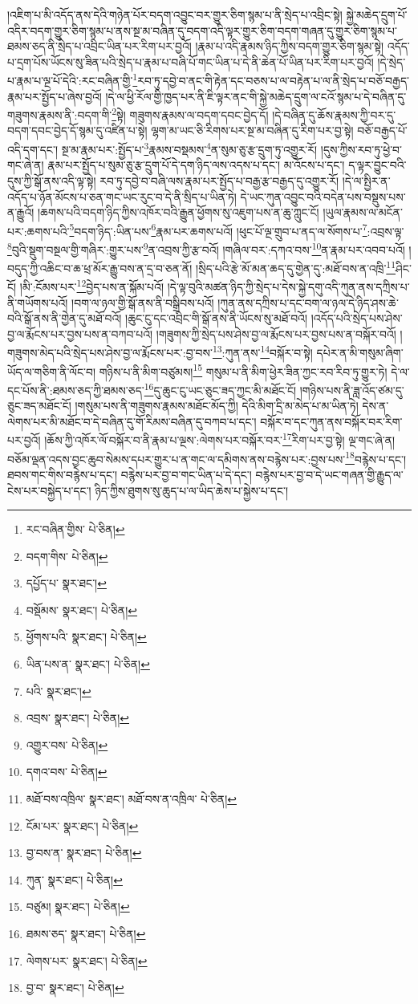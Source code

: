 །འཇིག་པ་མི་འདོད་ནས་དེའི་གཉེན་པོར་བདག་འབྱུང་བར་གྱུར་ཅིག་སྙམ་པ་ནི་སྲེད་པ་འབྲིང་སྟེ། སྐྱེ་མཆེད་དྲུག་པོ་འདིར་བདག་གྱུར་ཅིག་སྙམ་པ་ནས་སྔ་མ་བཞིན་དུ་བདག་འདི་ལྟར་གྱུར་ཅིག་བདག་གཞན་དུ་གྱུར་ཅིག་སྙམ་པ་ཐམས་ཅད་ནི་སྲེད་པ་འབྲིང་ཡིན་པར་རིག་པར་བྱའོ། །རྣམ་པ་འདི་རྣམས་ཉིད་ཀྱིས་བདག་གྱུར་ཅིག་སྙམ་སྟེ། འདོད་པ་དྲག་པོས་ཡོངས་སུ་ཟིན་པའི་སྲེད་པ་རྣམ་པ་བཞི་པོ་གང་ཡིན་པ་དེ་ནི་ཆེན་པོ་ཡིན་པར་རིག་པར་བྱའོ། །དེ་སྲེད་པ་རྣམ་པ་ལྔ་པོ་དེའི་:རང་བཞིན་གྱི་\footnote{རང་བཞིན་གྱིས་  པེ་ཅིན། }རབ་ཏུ་དབྱེ་བ་ནང་གི་རྟེན་དང་བཅས་པ་ལ་བརྟེན་པ་ལ་ནི་སྲེད་པ་བཅོ་བརྒྱད་རྣམ་པར་སྤྱོད་པ་ཞེས་བྱའོ། །དེ་ལ་ཕྱི་རོལ་གྱི་ཁྱད་པར་ནི་ཇི་ལྟར་ནང་གི་སྐྱེ་མཆེད་དྲུག་ལ་ངའོ་སྙམ་པ་དེ་བཞིན་དུ་གཟུགས་རྣམས་ནི་:བདག་གི་\footnote{བདག་གིས་  པེ་ཅིན། }སྟེ། གཟུགས་རྣམས་ལ་བདག་དབང་བྱེད་དོ། །དེ་བཞིན་དུ་ཆོས་རྣམས་ཀྱི་བར་དུ་བདག་དབང་བྱེད་དོ་སྙམ་དུ་འཛིན་པ་སྟེ། ལྷག་མ་ཡང་ཅི་རིགས་པར་སྔ་མ་བཞིན་དུ་རིག་པར་བྱ་སྟེ། བཅོ་བརྒྱད་པོ་འདི་དག་དང་། སྔ་མ་རྣམ་པར་:སྤྱོད་པ་\footnote{དཔྱོད་པ་  སྣར་ཐང་། }རྣམས་བསྡམས་\footnote{བསྡོམས་  སྣར་ཐང་།  པེ་ཅིན། }ན་སུམ་ཅུ་རྩ་དྲུག་ཏུ་འགྱུར་རོ། །དུས་ཀྱིས་རབ་ཏུ་ཕྱེ་བ་གང་ཞེ་ན། རྣམ་པར་སྤྱོད་པ་སུམ་ཅུ་རྩ་དྲུག་པོ་དེ་དག་ཉིད་ལས་འདས་པ་དང་། མ་འོངས་པ་དང་། ད་ལྟར་བྱུང་བའི་དུས་ཀྱི་སྒོ་ནས་འདི་ལྟ་སྟེ། རབ་ཏུ་དབྱེ་བ་བཞི་ལས་རྣམ་པར་སྤྱོད་པ་བརྒྱ་རྩ་བརྒྱད་དུ་འགྱུར་རོ། །དེ་ལ་སྤྱིར་ན་འདོད་པ་ཉོན་མོངས་པ་ཅན་གང་ཡང་རུང་བ་དེ་ནི་སྲིད་པ་ཡིན་ཏེ། དེ་ཡང་ཀུན་འབྱུང་བའི་བདེན་པས་བསྡུས་པས་ན་རྒྱུའོ། །ཆགས་པའི་བདག་ཉིད་ཀྱིས་འཁོར་བའི་རྒྱུན་ཕྱོགས་སུ་འཇུག་པས་ན་ཆུ་ཀླུང་ངོ། །ཡུལ་རྣམས་ལ་མངོན་པར་:ཆགས་པའི་\footnote{ཕྱོགས་པའི་  སྣར་ཐང་།  པེ་ཅིན། }བདག་ཉིད་:ཡིན་པས་\footnote{ཡིན་པས་ན་  སྣར་ཐང་།  པེ་ཅིན། }རྣམ་པར་ཆགས་པའོ། །ཕུང་པོ་ལྔ་གྲུབ་པ་ནད་ལ་སོགས་པ་\footnote{པའི་  སྣར་ཐང་། }:འབྲས་ལྟ་\footnote{འབྲས་  སྣར་ཐང་།  པེ་ཅིན། }བུའི་སྡུག་བསྔལ་གྱི་གཞིར་:གྱུར་པས་\footnote{འགྱུར་བས་  པེ་ཅིན། }ན་འབྲས་ཀྱི་རྩ་བའོ། །གཞིལ་བར་:དཀའ་བས་\footnote{དགའ་བས་  པེ་ཅིན། }ན་རྣམ་པར་འབབ་པའོ། །བདུད་ཀྱི་འཆིང་བ་ཆ་ཕྲ་མོར་རྒྱུ་བས་ན་དྲ་བ་ཅན་ནོ། །སྲིད་པའི་རྩེ་མོ་མན་ཆད་དུ་གྱེན་དུ་:མཐོ་བས་ན་འཁྲི་\footnote{མཐོ་བས་འཁྲིལ་  སྣར་ཐང་། མཐོ་བས་ན་འཁྲིལ་  པེ་ཅིན། }ཤིང་ངོ། །མི་:ངོམས་པར་\footnote{ངོམ་པར་  སྣར་ཐང་།  པེ་ཅིན། }བྱེད་པས་ན་སྐོམ་པའོ། །དེ་ལྟ་བུའི་མཚན་ཉིད་ཀྱི་སྲེད་པ་དེས་སྐྱེ་དགུ་འདི་ཀུན་ནས་དཀྲིས་པ་ནི་གཡོགས་པའོ། །བག་ལ་ཉལ་གྱི་སྒོ་ནས་ནི་བསྒྲིབས་པའོ། །ཀུན་ནས་དཀྲིས་པ་དང་བག་ལ་ཉལ་དེ་ཉིད་ཤས་ཆེ་བའི་སྒོ་ནས་ནི་གྱེན་དུ་མཐོ་བའོ། །ཆུང་ངུ་དང་འབྲིང་གི་སྒོ་ནས་ནི་ཡོངས་སུ་མཐོ་བའོ། །འདོད་པའི་སྲེད་པས་ཤེས་བྱ་ལ་རྨོངས་པར་བྱས་པས་ན་བཀབ་པའོ། །གཟུགས་ཀྱི་སྲེད་པས་ཤེས་བྱ་ལ་རྨོངས་པར་བྱས་པས་ན་བསྐོར་བའོ། །གཟུགས་མེད་པའི་སྲེད་པས་ཤེས་བྱ་ལ་རྨོངས་པར་:བྱ་བས་\footnote{བྱ་བས་ན་  སྣར་ཐང་།  པེ་ཅིན། }:ཀུན་ནས་\footnote{ཀུན་  སྣར་ཐང་།  པེ་ཅིན། }བསྐོར་བ་སྟེ། དཔེར་ན་མི་གསུམ་ཞིག་ཡོད་ལ་གཅིག་ནི་ལོང་བ། གཉིས་པ་ནི་མིག་བཙུམས།\footnote{བཙུམ།  སྣར་ཐང་།  པེ་ཅིན། } གསུམ་པ་ནི་མིག་ཕྱེར་ཟིན་ཀྱང་རབ་རིབ་ཏུ་གྱུར་ཏེ། དེ་ལ་དང་པོས་ནི་:ཐམས་ཅད་ཀྱི་ཐམས་ཅད་\footnote{ཐམས་ཅད་  སྣར་ཐང་།  པེ་ཅིན། }དུ་ཆུང་ངུ་ཡང་ཅུང་ཟད་ཀྱང་མི་མཐོང་ངོ། །གཉིས་པས་ནི་ཟླ་འོད་ཙམ་དུ་ཅུང་ཟད་མཐོང་ངོ། །གསུམ་པས་ནི་གཟུགས་རྣམས་མཐོང་མོད་ཀྱི། དེའི་མིག་དྲི་མ་མེད་པ་མ་ཡིན་ཏེ། དེས་ན་ལེགས་པར་མི་མཐོང་བ་དེ་བཞིན་དུ་གོ་རིམས་བཞིན་དུ་བཀབ་པ་དང་། བསྐོར་བ་དང་ཀུན་ནས་བསྐོར་བར་རིག་པར་བྱའོ། །ཆོས་ཀྱི་འཁོར་ལོ་བསྐོར་བ་ནི་རྣམ་པ་ལྔས་:ལེགས་པར་བསྐོར་བར་\footnote{ལེགས་པར་  སྣར་ཐང་།  པེ་ཅིན། }རིག་པར་བྱ་སྟེ། ལྔ་གང་ཞེ་ན། བཅོམ་ལྡན་འདས་བྱང་ཆུབ་སེམས་དཔར་གྱུར་པ་ན་གང་ལ་དམིགས་ནས་བརྙེས་པར་:བྱས་པས་\footnote{བྱ་བ་  སྣར་ཐང་།  པེ་ཅིན། }བརྙེས་པ་དང་། ཐབས་གང་གིས་བརྙེས་པ་དང་། བརྙེས་པར་བྱ་བ་གང་ཡིན་པ་དེ་དང་། བརྙེས་པར་བྱ་བ་དེ་ཡང་གཞན་གྱི་རྒྱུད་ལ་ངེས་པར་བསྐྱེད་པ་དང་། ཉིད་ཀྱིས་ཐུགས་སུ་ཆུད་པ་ལ་ཡིད་ཆེས་པ་སྐྱེས་པ་དང་། 